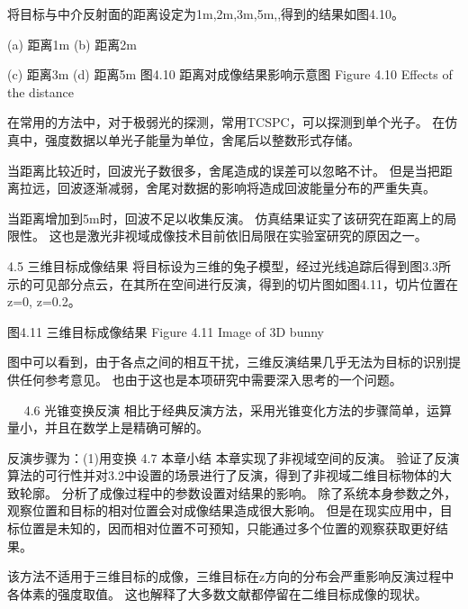将目标与中介反射面的距离设定为1m,2m,3m,5m,,得到的结果如图4.10。


  
(a) 距离1m                         (b) 距离2m
  
(c) 距离3m                         (d) 距离5m
图4.10 距离对成像结果影响示意图
Figure 4.10 Effects of the distance

在常用的方法中，对于极弱光的探测，常用TCSPC，可以探测到单个光子。
在仿真中，强度数据以单光子能量为单位，舍尾后以整数形式存储。

当距离比较近时，回波光子数很多，舍尾造成的误差可以忽略不计。
但是当把距离拉远，回波逐渐减弱，舍尾对数据的影响将造成回波能量分布的严重失真。

当距离增加到5m时，回波不足以收集反演。
仿真结果证实了该研究在距离上的局限性。
这也是激光非视域成像技术目前依旧局限在实验室研究的原因之一。

4.5  三维目标成像结果
将目标设为三维的兔子模型，经过光线追踪后得到图3.3所示的可见部分点云，在其所在空间进行反演，得到的切片图如图4.11，切片位置在z=0, z=0.2。


 
图4.11  三维目标成像结果
Figure 4.11 Image of 3D bunny

图中可以看到，由于各点之间的相互干扰，三维反演结果几乎无法为目标的识别提供任何参考意见。
也由于这也是本项研究中需要深入思考的一个问题。

 
4.6  光锥变换反演
相比于经典反演方法，采用光锥变化方法的步骤简单，运算量小，并且在数学上是精确可解的。

反演步骤为：(1)用变换 
4.7  本章小结
本章实现了非视域空间的反演。
验证了反演算法的可行性并对3.2中设置的场景进行了反演，得到了非视域二维目标物体的大致轮廓。
分析了成像过程中的参数设置对结果的影响。
除了系统本身参数之外，观察位置和目标的相对位置会对成像结果造成很大影响。
但是在现实应用中，目标位置是未知的，因而相对位置不可预知，只能通过多个位置的观察获取更好结果。

该方法不适用于三维目标的成像，三维目标在z方向的分布会严重影响反演过程中各体素的强度取值。
这也解释了大多数文献都停留在二维目标成像的现状。
